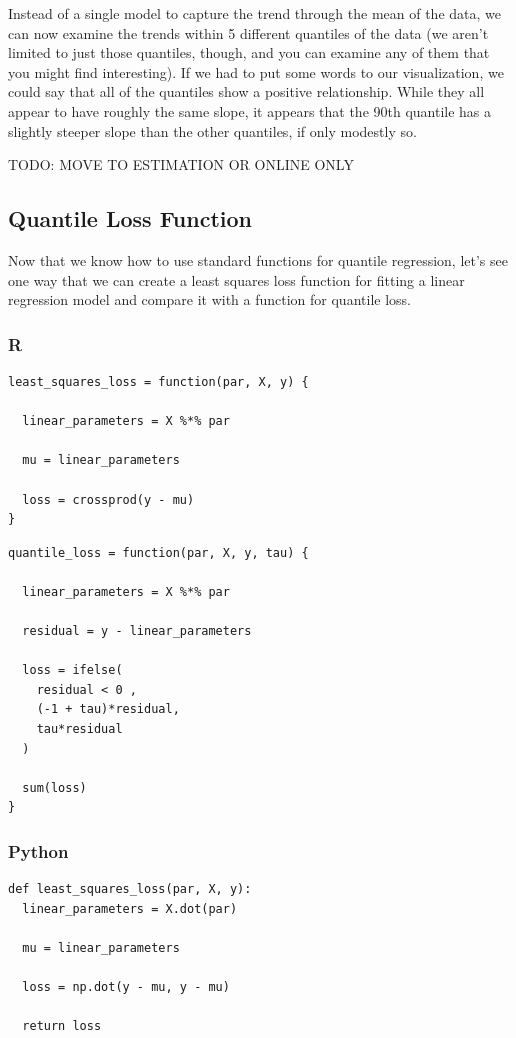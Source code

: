 \documentclass[
  letterpaper,
]{krantz}
\begin{document}
Instead of a single model to capture the trend through the mean of the
data, we can now examine the trends within 5 different quantiles of the
data (we aren't limited to just those quantiles, though, and you can
examine any of them that you might find interesting). If we had to put
some words to our visualization, we could say that all of the quantiles
show a positive relationship. While they all appear to have roughly the
same slope, it appears that the 90th quantile has a slightly steeper
slope than the other quantiles, if only modestly so.

TODO: MOVE TO ESTIMATION OR ONLINE ONLY

\subsection{Quantile Loss Function}\label{sec-quantile-loss}

Now that we know how to use standard functions for quantile regression,
let's see one way that we can create a least squares loss function for
fitting a linear regression model and compare it with a function for
quantile loss.

\subsubsection{R}

\begin{verbatim}
least_squares_loss = function(par, X, y) {
  
  linear_parameters = X %*% par
  
  mu = linear_parameters   
  
  loss = crossprod(y - mu)
}
\end{verbatim}

\begin{verbatim}
quantile_loss = function(par, X, y, tau) {
  
  linear_parameters = X %*% par
  
  residual = y - linear_parameters
  
  loss = ifelse(
    residual < 0 , 
    (-1 + tau)*residual, 
    tau*residual
  )
  
  sum(loss)
}
\end{verbatim}

\subsubsection{Python}

\begin{verbatim}
def least_squares_loss(par, X, y):
  linear_parameters = X.dot(par)
  
  mu = linear_parameters
  
  loss = np.dot(y - mu, y - mu)
  
  return loss
\end{verbatim}
\end{document}

